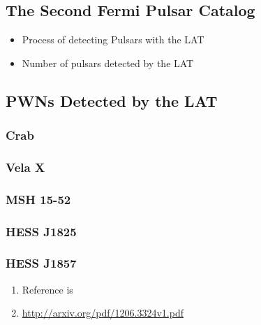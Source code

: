 \subsection{The Second Fermi Pulsar Catalog}

\begin{itemize}
  \item Process of detecting Pulsars with the \ac{LAT}
  \item Number of pulsars detected by the \ac{LAT}
\end{itemize}

\subsection{\acsp{PWN} Detected by the \ac{LAT}}

\subsubsection{Crab}

\subsubsection{Vela X}

\subsubsection{MSH 15-52}

\subsubsection{HESS J1825}

\subsubsection{HESS J1857}


\begin{enumerate}
  \item Reference is \cite{hess_j1857_lat_2012}
  \item \url{http://arxiv.org/pdf/1206.3324v1.pdf}
\end{enumerate}
